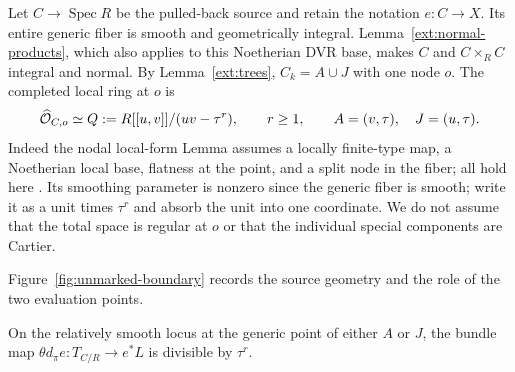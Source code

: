 Let $C\to\operatorname{Spec}R$ be the pulled-back source and retain
the notation $e:C\to X$. Its entire generic fiber is smooth and
geometrically integral. Lemma~\ref{ext:normal-products}, which also
applies to this Noetherian DVR base, makes $C$ and $C\times_R C$
integral and normal. By Lemma~\ref{ext:trees},
$C_k=A\cup J$ with one node $o$. The completed local ring at $o$ is
\begin{equation}\label{ext:node}
\widehat{\mathcal O}_{C,o}\simeq
Q:=R[[u,v]]/(uv-\tau^r),\qquad r\geq1,
\qquad A=(v,\tau),\quad J=(u,\tau).
\end{equation}
Indeed the nodal local-form Lemma assumes a locally finite-type
map, a Noetherian local base, flatness at the point, and a split
node in the fiber; all hold here
\cite[Lemma~53.20.11, Tag ]{Stacks}. Its smoothing parameter is
nonzero since the generic fiber is smooth; write it as a unit times
$\tau^r$ and absorb the unit into one coordinate. We do not assume
that the total space is regular at $o$ or that the individual special
components are Cartier.

Figure~\ref{fig:unmarked-boundary} records the source geometry and the
role of the two evaluation points.


\begin{lemma}
\label{ext:contact-order}
On the relatively smooth locus at the generic point of either $A$
or $J$, the bundle map
$\theta d_\pi e:T_{C/R}\to e^*L$ is divisible by $\tau^r$.
\end{lemma}

